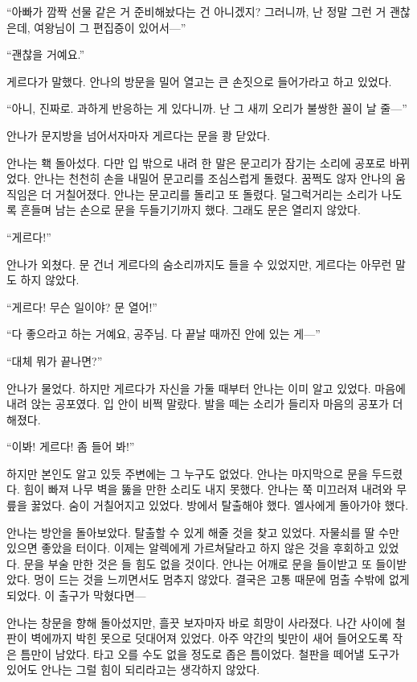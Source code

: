 ``아빠가 깜짝 선물 같은 거 준비해놨다는 건 아니겠지? 그러니까, 난 정말 그런 거 괜찮은데, 여왕님이 그 편집증이 있어서—''

``괜찮을 거예요.''

게르다가 말했다. 안나의 방문을 밀어 열고는 큰 손짓으로 들어가라고 하고 있었다.

``아니, 진짜로. 과하게 반응하는 게 있다니까. 난 그 새끼 오리가 불쌍한 꼴이 날 줄—''

안나가 문지방을 넘어서자마자 게르다는 문을 쾅 닫았다.

안나는 홱 돌아섰다. 다만 입 밖으로 내려 한 말은 문고리가 잠기는 소리에 공포로 바뀌었다. 안나는 천천히 손을 내밀어 문고리를 조심스럽게 돌렸다. 꿈쩍도 않자 안나의 움직임은 더 거칠어졌다. 안나는 문고리를 돌리고 또 돌렸다. 덜그럭거리는 소리가 나도록 흔들며 남는 손으로 문을 두들기기까지 했다. 그래도 문은 열리지 않았다.

``게르다!''

안나가 외쳤다. 문 건너 게르다의 숨소리까지도 들을 수 있었지만, 게르다는 아무런 말도 하지 않았다.

``게르다! 무슨 일이야? 문 열어!''

``다 좋으라고 하는 거예요, 공주님. 다 끝날 때까진 안에 있는 게—''

``대체 뭐가 끝나면?''

안나가 물었다. 하지만 게르다가 자신을 가둘 때부터 안나는 이미 알고 있었다. 마음에 내려 앉는 공포였다. 입 안이 비쩍 말랐다. 발을 떼는 소리가 들리자 마음의 공포가 더해졌다.

``이봐! 게르다! 좀 들어 봐!''

하지만 본인도 알고 있듯 주변에는 그 누구도 없었다. 안나는 마지막으로 문을 두드렸다. 힘이 빠져 나무 벽을 뚫을 만한 소리도 내지 못했다. 안나는 쭉 미끄러져 내려와 무릎을 꿇었다. 숨이 거칠어지고 있었다. 방에서 탈출해야 했다. 엘사에게 돌아가야 했다.

안나는 방안을 돌아보았다. 탈출할 수 있게 해줄 것을 찾고 있었다. 자물쇠를 딸 수만 있으면 좋았을 터이다. 이제는 알렉에게 가르쳐달라고 하지 않은 것을 후회하고 있었다. 문을 부술 만한 것은 들 힘도 없을 것이다. 안나는 어깨로 문을 들이받고 또 들이받았다. 멍이 드는 것을 느끼면서도 멈추지 않았다. 결국은 고통 때문에 멈출 수밖에 없게 되었다. 이 출구가 막혔다면—

안나는 창문을 향해 돌아섰지만, 흘끗 보자마자 바로 희망이 사라졌다. 나간 사이에 철판이 벽에까지 박힌 못으로 덧대어져 있었다. 아주 약간의 빛만이 새어 들어오도록 작은 틈만이 남았다. 타고 오를 수도 없을 정도로 좁은 틈이었다. 철판을 떼어낼 도구가 있어도 안나는 그럴 힘이 되리라고는 생각하지 않았다.

